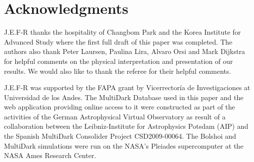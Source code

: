 \documentclass[usenatbib]{mn2e}
\begin{document}
\section*{Acknowledgments} 
J.E.F-R thanks the hospitality of Changbom Park and the Korea
Institute for Advanced Study where the first full draft of this paper
was completed. The authors also thank Peter Laursen, Paulina Lira, 
Alvaro Orsi and Mark Dijkstra for helpful comments on the physical
interpretation and presentation of our results. We would
also like to thank the referee for their helpful comments.

J.E.F-R was
supported by the FAPA grant by Vicerrector\'ia de Investigaciones at
Universidad de los Andes. The MultiDark Database used in this paper and the web application providing online access to it were constructed as part of the
activities of the German Astrophysical Virtual Observatory as result
of a collaboration between the Leibniz-Institute for Astrophysics
Potsdam (AIP) and the Spanish MultiDark Consolider Project
CSD2009-00064. The Bolshoi and MultiDark simulations were run on the
NASA's Pleiades supercomputer at the NASA Ames Research Center.




 
\end{document}
